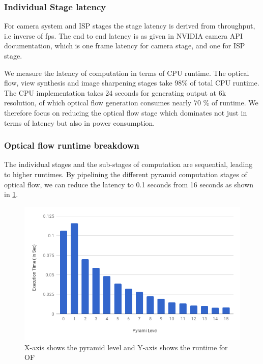\subsubsection{Individual Stage latency}


For camera system and ISP stages the stage latency is derived from throughput, i.e inverse of fps. The end to end latency is as given in NVIDIA camera API documentation, which is one frame latency for camera stage, and one for ISP stage. 

We measure the latency of computation in terms of CPU runtime. The optical flow, view synthesis and image sharpening stages take 98\% of total CPU runtime. The CPU  implementation takes 24 seconds for generating output at 6k resolution, of which optical flow generation consumes nearly 70 \% of runtime. We therefore focus on reducing the optical flow stage which dominates not just in terms of latency but also in power consumption. 


\subsubsection{Optical flow runtime breakdown}
The individual stages and the sub-stages of computation are sequential, leading to higher runtimes. By pipelining the different pyramid computation stages of optical flow, we can reduce the latency to 0.1 seconds from 16 seconds as shown in \ref{fig:OF_pyr_runtime}.

\begin{figure}[h]
	\begin{center}
		\includegraphics[width=1\textwidth]{data/images/pyramid_runtime.png}

	\end{center}
		\caption{X-axis shows the pyramid level and Y-axis shows the runtime for OF}
\label{fig:OF_pyr_runtime}
\end{figure} 

